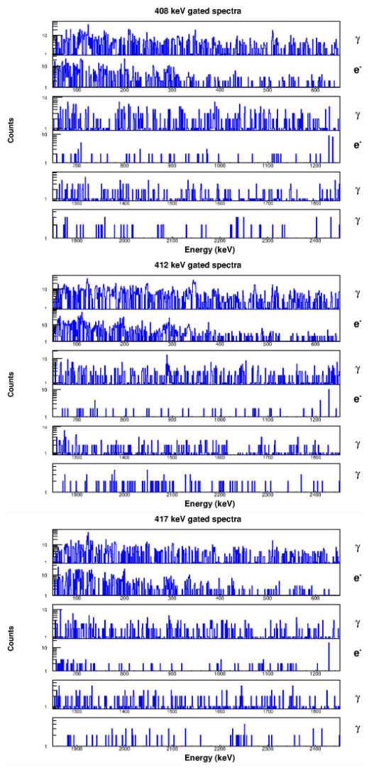 \includegraphics[scale=0.8]{154Gd_Appendix/408_combined.eps}
\includegraphics[scale=0.8]{154Gd_Appendix/412_combined.eps}
\includegraphics[scale=0.8]{154Gd_Appendix/417_combined.eps}
